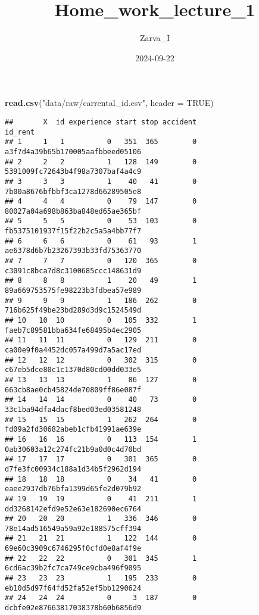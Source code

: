 \documentclass[
]{article}
\title{Home\_work\_lecture\_1}
\author{Zarva\_I}
\date{2024-09-22}
\newenvironment{Shaded}{\begin{snugshade}}{\end{snugshade}}
\newcommand{\AttributeTok}[1]{\textcolor[rgb]{0.13,0.29,0.53}{#1}}
\newcommand{\ConstantTok}[1]{\textcolor[rgb]{0.56,0.35,0.01}{#1}}
\newcommand{\FunctionTok}[1]{\textcolor[rgb]{0.13,0.29,0.53}{\textbf{#1}}}
\newcommand{\NormalTok}[1]{#1}
\newcommand{\StringTok}[1]{\textcolor[rgb]{0.31,0.60,0.02}{#1}}
\begin{document}
\maketitle

\begin{Shaded}
\begin{Highlighting}[]
\FunctionTok{read.csv}\NormalTok{(}\StringTok{"data/raw/carrental\_id.csv"}\NormalTok{, }\AttributeTok{header =} \ConstantTok{TRUE}\NormalTok{)}
\end{Highlighting}
\end{Shaded}

\begin{verbatim}
##       X  id experience start stop accident                          id_rent
## 1     1   1          0   351  365        0 a3f7d4a39b65b170005aafbbeed05106
## 2     2   2          1   128  149        0 5391009fc72643b4f98a7307baf4a4c9
## 3     3   3          1    40   41        0 7b00a8676bfbbf3ca1278d66289505e8
## 4     4   4          0    79  147        0 80027a04a698b863ba848ed65ae365bf
## 5     5   5          0    53  103        0 fb5375101937f15f22b2c5a5a4bb77f7
## 6     6   6          0    61   93        1 ae6378d6b7b23267393b33fd75363770
## 7     7   7          0   120  365        0 c3091c8bca7d8c3100685ccc148631d9
## 8     8   8          1    20   49        1 89a669753575fe98223b3fdbea57e989
## 9     9   9          1   186  262        0 716b625f49be23bd289d3d9c1524549d
## 10   10  10          0   105  332        1 faeb7c89581bba634fe68495b4ec2905
## 11   11  11          0   129  211        0 ca00e9f0a4452dc057a499d7a5ac17ed
## 12   12  12          0   302  315        0 c67eb5dce80c1c1370d80cd00dd033e5
## 13   13  13          1    86  127        0 663cb8ae0cb45824de70809ff86e087f
## 14   14  14          0    40   73        0 33c1ba94dfa4dacf8bed03ed03581248
## 15   15  15          1   262  264        0 fd09a2fd30682abeb1cfb41991ae639e
## 16   16  16          0   113  154        1 0ab30603a12c274fc21b9a0d0c4d70bd
## 17   17  17          0   301  365        0 d7fe3fc00934c188a1d34b5f2962d194
## 18   18  18          0    34   41        0 eaee2937db76bfa1399d65fe2d079b92
## 19   19  19          0    41  211        1 dd3268142efd9e52e63e182690ec6764
## 20   20  20          1   336  346        0 78e14ad516549a59a92e188575cff394
## 21   21  21          1   122  144        0 69e60c3909c6746295f0cfd0e8af4f9e
## 22   22  22          0   301  345        1 6cd6ac39b2fc7ca749ce9cba496f9095
## 23   23  23          1   195  233        0 eb10d5d97f64fd52fa52ef5bb1290624
## 24   24  24          0     3  187        0 dcbfe02e87663817038378b60b6856d9

\end{verbatim}
\end{document}
